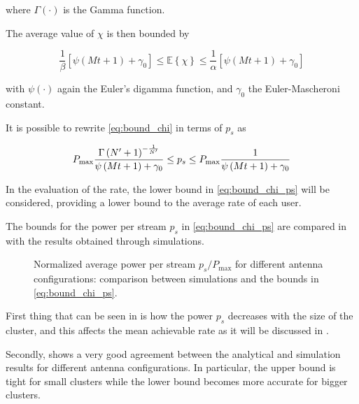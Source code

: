 \noindent
where $\Gamma\left(\cdot\right)$ is the Gamma function.

The average value of $\chi$ is then bounded by

\begin{equation} \label{eq:bound_chi}
    \frac{1}{\beta}\left[\psi\left(Mt + 1\right) + \gamma_0\right] \leq
    \mathbb{E}\left\{\chi\right\} \leq
    \frac{1}{\alpha}\left[\psi\left(Mt + 1\right) + \gamma_0\right]
\end{equation}

\noindent
with $\psi\left(\cdot\right)$ again the Euler's digamma function, and $\gamma_0$ the Euler-Mascheroni
constant.

It is possible to rewrite \eqref{eq:bound_chi} in terms of $p_s$ as

\begin{equation} \label{eq:bound_chi_ps}
    P_{\max} \frac{\Gamma\left(N^{\prime} + 1\right)^{-\frac{1}{N^{\prime}}}}
        {\psi\left(Mt + 1\right) + \gamma_0} \leq p_s \leq
        P_{\max}\frac{1}{\psi\left(Mt + 1\right) + \gamma_0}
\end{equation}

In the evaluation of the rate, the lower bound in \eqref{eq:bound_chi_ps} will
be considered, providing a lower bound to the average rate of each user.

The bounds for the power per stream $p_s$ in \eqref{eq:bound_chi_ps} are
compared in  with the results obtained through simulations.

\begin{figure}[t]
\begin{center}
\dummybox
\end{center}
\caption{Normalized average power per stream $p_s / P_{\max}$ for different
antenna configurations: comparison between simulations and the bounds in
\eqref{eq:bound_chi_ps}.}
\label{fig:bound_chi}
\end{figure}

First thing that can be seen in  is how the power $p_s$
decreases with the size of the cluster, and this affects the mean achievable
rate as it will be discussed in .

Secondly,  shows a very good agreement between the
analytical and simulation results for different antenna configurations. In
particular, the upper bound is tight for small clusters while the lower bound
becomes more accurate for bigger clusters.

